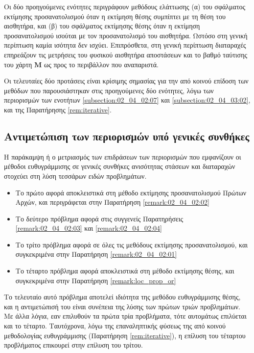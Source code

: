 Οι δύο προηγούμενες ενότητες περιγράφουν μεθόδους ελάττωσης (α) του σφάλματος
εκτίμησης προσανατολισμού όταν η εκτίμηση θέσης συμπίπτει με τη θέση του
αισθητήρα, και (β) του σφάλματος εκτίμησης θέσης όταν η εκτίμηση
προσανατολισμού ισούται με τον προσανατολισμό του αισθητήρα. Ωστόσο στη γενική
περίπτωση καμία ισότητα δεν ισχύει. Επιπρόσθετα, στη γενική περίπτωση
διαταραχές επηρεάζουν τις μετρήσεις του φυσικού αισθητήρα αποστάσεων και το
βαθμό ταύτισης του χάρτη $\bm{M}$ ως προς το περιβάλλον που αναπαριστά.

Οι τελευταίες δύο προτάσεις είναι κρίσιμης σημασίας για την από κοινού επίδοση
των μεθόδων που παρουσιάστηκαν στις προηγούμενες δύο ενότητες, λόγω των
περιορισμών των ενοτήτων \ref{subsection:02_04_02:07} και
\ref{subsection:02_04_03:02}, και της Παρατήρησης \ref{rem:iterative}.


\subsection{Αντιμετώπιση των περιορισμών υπό γενικές συνθήκες}

Η παράκαμψη ή ο μετριασμός των επιδράσεων των περιορισμών που εμφανίζουν οι
μέθοδοι ευθυγράμμισης σε γενικές συνθήκες ανισότητας στάσεων και διαταραχών
στοχεύει στη λύση τεσσάρων ειδών προβλημάτων.

\begin{itemize}
  \item Το πρώτο αφορά αποκλειστικά στη μέθοδο εκτίμησης προσανατολισμού
        Πρώτων Αρχών, και περιγράφεται στην Παρατήρηση \ref{remark:02_04_02:02}
  \item Το δεύτερο πρόβλημα αφορά στις συγγενείς Παρατηρήσεις
        \ref{remark:02_04_02:03} και \ref{remark:02_04_02:04}
  \item Το τρίτο πρόβλημα αφορά σε όλες τις μεθόδους εκτίμησης προσανατολισμού,
        και συγκεκριμένα στην Παρατήρηση \ref{remark:02_04_02:01}
  \item Το τέταρτο πρόβλημα αφορά αποκλειστικά στη μέθοδο εκτίμησης θέσης, και
        συγκεκριμένα στην Παρατήρηση \ref{remark:loc_prop_or}
\end{itemize}

Το τελευταίο αυτό πρόβλημα αποτελεί ιδιότητα της μεθόδου ευθυγράμμισης θέσης,
και η αντιμετώπισή του είναι συνέπεια της λύσης των πρώτων τριών προβλημάτων.
Με άλλα λόγια, εαν επιλυθούν τα πρώτα τρία προβλήματα, τότε αυτομάτως
επιλύεται και το τέταρτο. Ταυτόχρονα, λόγω της επαναληπτικής φύσεως της
από κοινού μεθοδολογίας ευθυγράμμισης (Παρατήρηση \ref{rem:iterative}),
η επίλυση του τέταρτου προβλήματος επικουρεί στην επίλυση του τρίτου. \\


